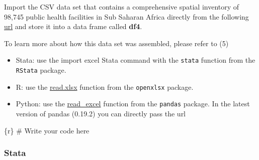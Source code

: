 \documentclass[
  letterpaper,
  DIV=11,
  numbers=noendperiod]{scrreprt}
\newenvironment{Shaded}{\begin{snugshade}}{\end{snugshade}}
\newcommand{\CommentTok}[1]{\textcolor[rgb]{0.37,0.37,0.37}{#1}}
\newcommand{\InformationTok}[1]{\textcolor[rgb]{0.37,0.37,0.37}{#1}}
\providecommand{\tightlist}{%
  \setlength{\itemsep}{0pt}\setlength{\parskip}{0pt}}\usepackage{longtable,booktabs,array}
\begin{document}
Import the CSV data set that contains a comprehensive spatial inventory
of 98,745 public health facilities in Sub Saharan Africa directly from
the following
\href{https://open.africa/dataset/d7335980-29d5-476c-bf7a-feb4e22cf631/resource/e2432e8a-cf15-4a8b-b8c3-567f443c1459/download/cfa-data-hospitals-in-africa-00-ssa-mfl-130219.xlsx-ssa-mfl.csv}{url}
and store it into a data frame called \textbf{df4}.

To learn more about how this data set was assembled, please refer to (5)

\begin{tcolorbox}[enhanced jigsaw, colframe=quarto-callout-tip-color-frame, colback=white, rightrule=.15mm, bottomrule=.15mm, left=2mm, arc=.35mm, coltitle=black, title=\textcolor{quarto-callout-tip-color}{\faLightbulb}\hspace{0.5em}{Tip}, opacitybacktitle=0.6, bottomtitle=1mm, opacityback=0, toptitle=1mm, toprule=.15mm, colbacktitle=quarto-callout-tip-color!10!white, titlerule=0mm, leftrule=.75mm, breakable]

\begin{itemize}
\tightlist
\item
  Stata: use the import excel Stata command with the \texttt{stata}
  function from the \texttt{RStata} package.
\item
  R: use the
  \href{https://www.rdocumentation.org/packages/openxlsx/versions/4.2.5/topics/read.xlsx}{read.xlsx}
  function from the \texttt{openxlsx} package.
\item
  Python: use the
  \href{https://pandas.pydata.org/docs/reference/api/pandas.read_excel.html}{read\_excel}
  function from the \texttt{pandas} package. In the latest version of
  pandas (0.19.2) you can directly pass the url
\end{itemize}

\end{tcolorbox}

\begin{Shaded}
\begin{Highlighting}[]
\InformationTok{\textasciigrave{}\textasciigrave{}\textasciigrave{}\{r\}}
\CommentTok{\# Write your code here}
\InformationTok{\textasciigrave{}\textasciigrave{}\textasciigrave{}}
\end{Highlighting}
\end{Shaded}

\hypertarget{stata-3}{%
\subsubsection{Stata}\label{stata-3}}
\end{document}
